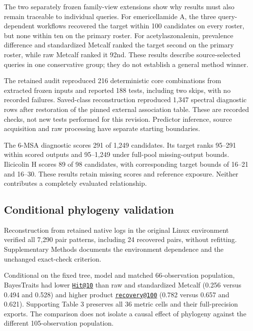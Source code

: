 \documentclass[
  10pt,
  a4paper,
]{article}
\newcounter{none} %
\begin{document}
The two separately frozen family-view extensions show why results must also remain traceable to individual queries. For emericellamide A, the three query-dependent workflows recovered the target within 100 candidates on every roster, but none within ten on the primary roster. For acetylaszonalenin, prevalence difference and standardized Metcalf ranked the target second on the primary roster, while raw Metcalf ranked it 92nd. These results describe source-selected queries in one conservative group; they do not establish a general method winner.

The retained audit reproduced 216 deterministic core combinations from extracted frozen inputs and reported 188 tests, including two skips, with no recorded failures. Saved-class reconstruction reproduced 1,347 spectral diagnostic rows after restoration of the pinned external association table. These are recorded checks, not new tests performed for this revision. Predictor inference, source acquisition and raw processing have separate starting boundaries.

The 6-MSA diagnostic scores 291 of 1,249 candidates. Its target ranks 95--291 within scored outputs and 95--1,249 under full-pool missing-output bounds. Ilicicolin H scores 89 of 98 candidates, with corresponding target bounds of 16--21 and 16--30. These results retain missing scores and reference exposure. Neither contributes a completely evaluated relationship.

\subsection{Conditional phylogeny validation}\label{conditional-phylogeny-validation}

Reconstruction from retained native logs in the original Linux environment verified all 7,290 pair patterns, including 24 recovered pairs, without refitting. Supplementary Methods documents the environment dependence and the unchanged exact-check criterion.

Conditional on the fixed tree, model and matched 66-observation population, BayesTraits had lower \href{mailto:Hit@10}{\nolinkurl{Hit@10}} than raw and standardized Metcalf (0.256 versus 0.494 and 0.528) and higher product \href{mailto:recovery@100}{\nolinkurl{recovery@100}} (0.782 versus 0.657 and 0.621). Supporting Table 3 preserves all 36 metric cells and their full-precision exports. The comparison does not isolate a causal effect of phylogeny against the different 105-observation population.
\end{document}
